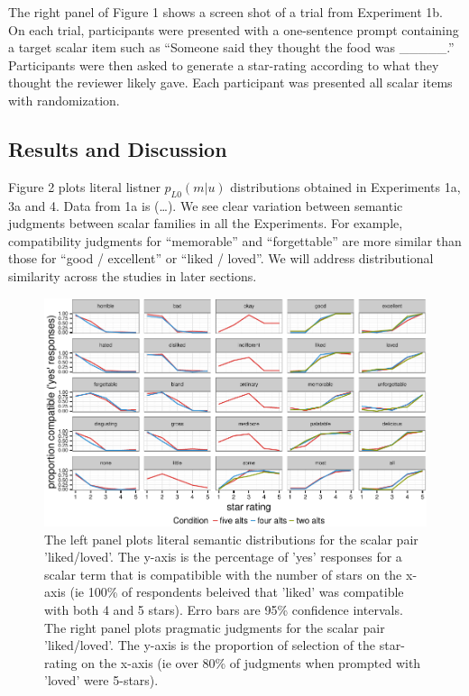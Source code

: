 \documentclass[10pt, letterpaper]{article}
\newenvironment{CodeChunk}{}{}
\begin{document}
The right panel of Figure 1 shows a screen shot of a trial from
Experiment 1b. On each trial, participants were presented with a
one-sentence prompt containing a target scalar item such as ``Someone
said they thought the food was \_\_\_\_\_.'' Participants were then
asked to generate a star-rating according to what they thought the
reviewer likely gave. Each participant was presented all scalar items
with randomization.

\subsection{Results and Discussion}\label{results-and-discussion}

Figure 2 plots literal listner \(p_{L0}(m|u)\) distributions obtained in
Experiments 1a, 3a and 4. Data from 1a is (\ldots{}). We see clear
variation between semantic judgments between scalar families in all the
Experiments. For example, compatibility judgments for ``memorable'' and
``forgettable'' are more similar than those for ``good / excellent'' or
``liked / loved''. We will address distributional similarity across the
studies in later sections.

\begin{CodeChunk}
\begin{figure}[t]

{\centering \includegraphics{figs/exp1Plots-1} 

}

\caption[The left panel plots literal semantic distributions for the scalar pair 'liked/loved']{The left panel plots literal semantic distributions for the scalar pair 'liked/loved'. The y-axis is the percentage of 'yes' responses for a scalar term that is compatibible with the number of stars on the x-axis (ie 100\% of respondents beleived that 'liked' was compatible with both 4 and 5 stars). Erro bars are 95\% confidence intervals. The right panel plots pragmatic judgments for the scalar pair 'liked/loved'. The y-axis is the proportion of selection of the star-rating on the x-axis (ie over 80\% of judgments when prompted with 'loved' were 5-stars).}\label{fig:exp1Plots}
\end{figure}
\end{CodeChunk}
\end{document}
